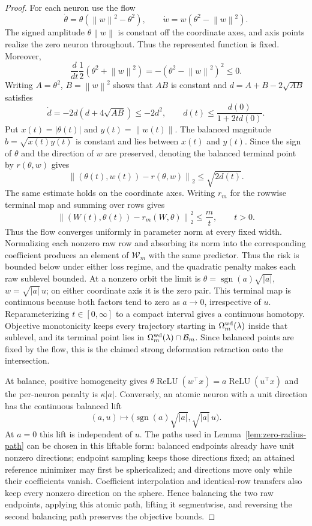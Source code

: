 \documentclass[smallextended,envcountsect]{svjour3}
\newcommand{\relu}{\operatorname{ReLU}}
\newcommand{\norm}[1]{\left\lVert #1 \right\rVert}
\newcommand{\abs}[1]{\left\lvert #1 \right\rvert}
\begin{document}
\begin{proof}
For each neuron use the flow
\[
 \dot\theta=\theta(\norm w^2-\theta^2),
 \qquad
 \dot w=w(\theta^2-\norm w^2).
\]
The signed amplitude $\theta\norm w$ is constant off the coordinate axes, and
axis points realize the zero neuron throughout.  Thus the represented function
is fixed.  Moreover,
\[
 \frac d{dt}\frac12(\theta^2+\norm w^2)
 =-(\theta^2-\norm w^2)^2\le0.
\]
Writing $A=\theta^2$, $B=\norm w^2$ shows that $AB$ is constant and
$d=A+B-2\sqrt{AB}$ satisfies
\[
 \dot d=-2d(d+4\sqrt{AB})\le-2d^2,
 \qquad d(t)\le\frac{d(0)}{1+2td(0)}.
\]
Put $x(t)=\abs{\theta(t)}$ and $y(t)=\norm{w(t)}$.  The balanced magnitude
$b=\sqrt{x(t)y(t)}$ is constant and lies between $x(t)$ and $y(t)$.  Since
the sign of $\theta$ and the direction of $w$ are preserved, denoting the
balanced terminal point by $r(\theta,w)$ gives
\[
 \norm{(\theta(t),w(t))-r(\theta,w)}_2
 \le \sqrt{2d(t)}.
\]
The same estimate holds on the coordinate axes.  Writing $r_m$ for the rowwise
terminal map and summing over rows gives
\[
 \norm{(W(t),\theta(t))-r_m(W,\theta)}_2^2\le \frac mt,
 \qquad t>0.
\]
Thus the flow converges uniformly in parameter norm at every fixed width.
Normalizing each nonzero raw row and absorbing its norm into the corresponding
coefficient produces an element of $\mathcal W_m$ with the same predictor.
Thus the risk is bounded below under either loss regime, and the quadratic
penalty makes each raw sublevel bounded.
At a nonzero orbit the limit is
$\theta=\operatorname{sgn}(a)\sqrt{\abs a}$,
$w=\sqrt{\abs a}\,u$; on either coordinate axis it is the zero pair. This
terminal map is continuous because both factors tend to zero as $a\to0$,
irrespective of $u$. Reparameterizing $t\in[0,\infty]$ to a compact interval
gives a continuous homotopy. Objective monotonicity keeps every trajectory
starting in $\Omega_m^{\rm wd}(\lambda)$ inside that sublevel, and its terminal
point lies in $\Omega_m^{\rm wd}(\lambda)\cap\mathcal B_m$. Since balanced
points are fixed by the flow, this is the claimed strong deformation
retraction onto the intersection.

At balance, positive homogeneity gives
$\theta\relu(w^\top x)=a\relu(u^\top x)$ and the per-neuron penalty is
$\kappa\abs a$.  Conversely, an atomic neuron with a unit direction has the
continuous balanced lift
\[
 (a,u)\longmapsto
 \bigl(\operatorname{sgn}(a)\sqrt{\abs a},
       \sqrt{\abs a}\,u\bigr).
\]
At $a=0$ this lift is independent of $u$.  The paths used in
Lemma~\ref{lem:zero-radius-path} can be chosen in this liftable form: balanced
endpoints already have unit nonzero directions; endpoint sampling keeps those
directions fixed; an attained reference minimizer may first be sphericalized;
and directions move only while their coefficients vanish.  Coefficient
interpolation and identical-row transfers also keep every nonzero direction
on the sphere.  Hence balancing the two raw endpoints, applying this atomic
path, lifting it segmentwise, and reversing the second balancing path
preserves the objective bounds.


\end{proof}
\end{document}
